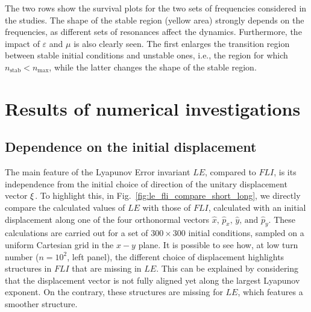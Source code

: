 %
The two rows show the survival plots for the two sets of frequencies considered in the studies. The shape of the stable region (yellow area) strongly depends on the frequencies, as different sets of resonances affect the dynamics. Furthermore, the impact of $\varepsilon$ and $\mu$ is also clearly seen. The first enlarges the transition region between stable initial conditions and unstable ones, i.e., the region for which $n_\mathrm{stab} < n_\mathrm{max}$, while the latter changes the shape of the stable region.
%
\section{\label{sec:results} Results of numerical investigations}
%
\subsection{Dependence on the initial displacement}

The main feature of the Lyapunov Error invariant $LE$, compared to $FLI$, is its independence from the initial choice of direction of the unitary displacement vector $\vb{\xi}$. To highlight this, in Fig.~\ref{fig:le_fli_compare_short_long}, we directly compare the calculated values of $LE$ with those of $FLI$, calculated with an initial displacement along one of the four orthonormal vectors $\hat{x},\,\hat{p}_x,\,\hat{y},\,\text{and }\hat{p}_y$. These calculations are carried out for a set of $300\times300$ initial conditions, sampled on a uniform Cartesian grid in the $x-y$ plane. It is possible to see how, at low turn number ($n=10^2$, left panel), the different choice of displacement highlights structures in $FLI$ that are missing in $LE$. This can be explained by considering that the displacement vector is not fully aligned yet along the largest Lyapunov exponent. On the contrary, these structures are missing for $LE$, which features a smoother structure.

